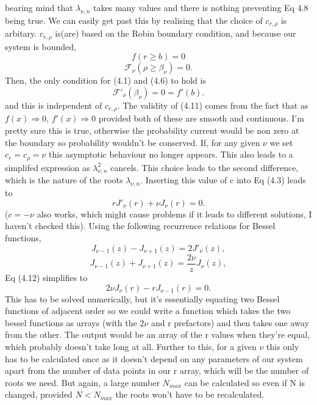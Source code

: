 \documentclass[10pt]{article}
\numberwithin{equation}{section}
\begin{document}
\begin{multicols}{2}
\begin{equation}
\end{equation}
bearing mind that $\lambda_{\nu,n}$ takes many values and there is nothing preventing Eq 4.8 being true. We can easily get past this by realising that the choice of $c_{r,\rho}$ is arbitary. $c_{r,\rho}$ is(are) based on the Robin boundary condition, and because our system is bounded, 
\begin{equation}
f(r\geqslant b) = 0
\end{equation}
\begin{equation}
\mathcal{F}_{\nu}(\rho\geqslant\beta_{\nu}) = 0.
\end{equation}
Then, the only condition for (4.1) and (4.6) to hold is
\begin{equation}
 \mathcal{F}'_{\nu}(\beta_{\nu}) = 0 = f'(b).
\end{equation}
and this is independent of $c_{r,\rho}$. The validity of (4.11) comes from the fact that as $f(x)\Rightarrow0$, $f'(x)\Rightarrow0$ provided both of these are smooth and continuous. I'm pretty sure this is true, otherwise the probability current would be non zero at the boundary so probability wouldn't be conserved. If, for any given $\nu$ we set $c_{r}=c_{\rho}=\nu$ this asymptotic behaviour no longer appears. This also leads to a simplifed expression as $\lambda^{2}_{\nu,n}$ cancels. This choice leads to the second difference, which is the nature of the roots $\lambda_{\nu,n}$. Inserting this value of c into Eq (4.3) leads to
\begin{equation}
rJ'_{\nu}(r)+\nu J_{\nu}(r)=0.
\end{equation}
($c = -\nu$ also works, which might cause problems if it leads to different solutions, I haven't checked this).
Using the following recurrence relations for Bessel functions,
\begin{equation}
J_{\nu-1}(z)-J_{\nu+1}(z) = 2J'_{\nu}(z),
\end{equation}
\begin{equation}
J_{\nu-1}(z)+J_{\nu+1}(z) = \frac{2\nu}{z}J_{\nu}(z),
\end{equation}
Eq (4.12) simplifies to 
\begin{equation}
2\nu J_{\nu}(r)-rJ_{\nu-1}(r)=0.
\end{equation}
This has to be solved numerically, but it's essentially equating two Bessel functions of adjacent order so we could write a function which takes the two bessel functions as arrays (with the $2\nu$ and r prefactors) and then takes one away from the other. The output would be an array of the r values when they're equal, which probably doesn't take long at all. Further to this, for a given $\nu$ this only has to be calculated once as it doesn't depend on any parameters of our system apart from the number of data points in our r array, which will be the number of roots we need. But again, a large number $N_{max}$ can be calculated so even if N is changed, provided $N<N_{max}$ the roots won't have to be recalculated.


\end{multicols}
\end{document}
